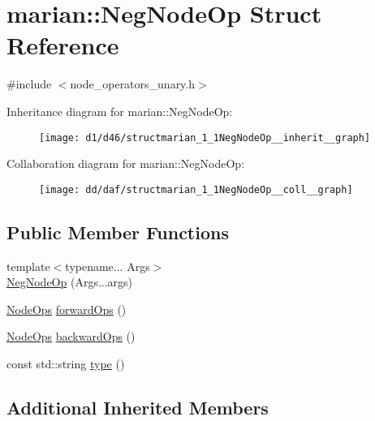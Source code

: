 \hypertarget{structmarian_1_1NegNodeOp}{}\section{marian\+:\+:Neg\+Node\+Op Struct Reference}
\label{structmarian_1_1NegNodeOp}


{\ttfamily \#include $<$node\+\_\+operators\+\_\+unary.\+h$>$}



Inheritance diagram for marian\+:\+:Neg\+Node\+Op\+:
\nopagebreak
\begin{figure}[H]
\begin{center}
\leavevmode
\texttt{[image: d1/d46/structmarian\_1\_1NegNodeOp\_\_inherit\_\_graph]}
\end{center}
\end{figure}


Collaboration diagram for marian\+:\+:Neg\+Node\+Op\+:
\nopagebreak
\begin{figure}[H]
\begin{center}
\leavevmode
\texttt{[image: dd/daf/structmarian\_1\_1NegNodeOp\_\_coll\_\_graph]}
\end{center}
\end{figure}
\subsection*{Public Member Functions}
\begin{DoxyCompactItemize}
\item 
{\footnotesize template$<$typename... Args$>$ }\\\hyperlink{structmarian_1_1NegNodeOp_ab41dc50b949d1a678dd1b31d57fd40bf}{Neg\+Node\+Op} (Args...\+args)
\item 
\hyperlink{namespacemarian_a4956376218cc236016c20bc4071470da}{Node\+Ops} \hyperlink{structmarian_1_1NegNodeOp_a13e2bb54f68b3d7d42cc21dcbfdb0b26}{forward\+Ops} ()
\item 
\hyperlink{namespacemarian_a4956376218cc236016c20bc4071470da}{Node\+Ops} \hyperlink{structmarian_1_1NegNodeOp_ab7f6421e5106374dae28e016b48280fd}{backward\+Ops} ()
\item 
const std\+::string \hyperlink{structmarian_1_1NegNodeOp_afa43ad1f4e1b5e77063d2dfbe8b9bd29}{type} ()
\end{DoxyCompactItemize}
\subsection*{Additional Inherited Members}


